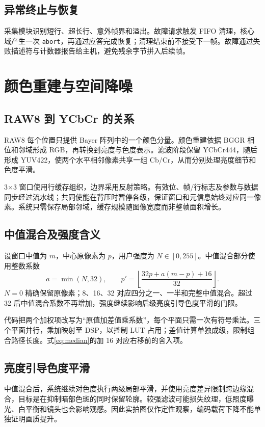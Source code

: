 \subsection{异常终止与恢复}
采集模块识别短行、超长行、意外帧界和溢出。故障请求触发 FIFO 清理，核心域产生一次 \texttt{abort}，再通过应答完成恢复；清理结束前不接受下一帧。故障通过失败描述符与计数器报告给主机，避免残余字节拼入后续帧。
\clearpage

\section{颜色重建与空间降噪}
\subsection{RAW8 到 YCbCr 的关系}
RAW8 每个位置只提供 Bayer 阵列中的一个颜色分量。颜色重建依据 BGGR 相位和邻域形成 RGB，再转换到亮度与色度表示。滤波阶段保留 YCbCr444，随后形成 YUV422，使两个水平相邻像素共享一组 Cb/Cr，从而分别处理亮度细节和色度平滑。

3×3 窗口使用行缓存组织，边界采用反射策略。有效位、帧/行标志及参数与数据同步经过流水线；共同使能在背压时暂停各级，保证窗口和元信息始终对应同一像素。系统只需保存局部邻域，缓存规模随图像宽度而非整帧面积增长。

\subsection{中值混合及强度含义}
设窗口中值为 $m$，中心原像素为 $p$，用户强度为 $N\in[0,255]$。中值混合部分使用整数系数
\begin{equation}
a=\min(N,32),\qquad p'=\left\lfloor\frac{32p+a(m-p)+16}{32}\right\rfloor.\label{eq:median}
\end{equation}
$N=0$ 精确保留原像素；8、16、32 对应四分之一、一半和完整中值混合。超过 32 后中值混合系数不再增加，强度继续影响后级亮度引导色度平滑的门限。

代码把两个加权项改写为“原值加差值乘系数”，每个平面只需一次有符号乘法。三个平面并行，乘加映射至 DSP，以控制 LUT 占用；差值计算单独成级，限制组合路径长度。式\eqref{eq:median}的加 16 对应右移前的舍入项。

\subsection{亮度引导色度平滑}
中值混合后，系统继续对色度执行两级局部平滑，并使用亮度差异限制跨边缘混合，目标是在抑制暗部色斑的同时保留轮廓。较强滤波可能损失纹理，低照度曝光、白平衡和镜头也会影响观感。因此实拍图仅作定性观察，编码载荷下降不能单独证明画质提升。
\clearpage


